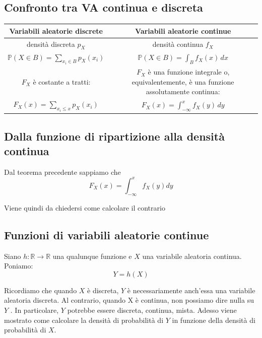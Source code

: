 \subsection{Confronto tra VA continua e discreta}
\begin{tabular}{|c|c|}
  \hline
  \textbf{Variabili aleatorie discrete} & \textbf{Variabili aleatorie continue} \\
  \hline
  densità discreta $p_X$ & densità continua $f_X$ \\
  \hline
  $\mathbb{P}(X \in B) = \sum_{x_i \in B} p_X(x_i)$ & $\mathbb{P}(X \in B) = \int_B f_X(x) \, dx$ \\
  \hline
  $F_X$ è costante a tratti: & $F_X$ è una funzione integrale o, equivalentemente, è una funzione assolutamente continua: \\
  $F_X(x) = \sum_{x_i \leq x} p_X(x_i)$ & $F_X(x) = \int_{-\infty}^x f_X(y) \, dy$ \\
  \hline
\end{tabular}

\subsection{Dalla funzione di ripartizione alla densità continua}
Dal teorema precedente sappiamo che 
\[
  F_X(x) = \int_{-\infty}^{x} f_X(y) dy
\]

Viene quindi da chiedersi come calcolare il contrario



\subsection{Funzioni di variabili aleatorie continue}
Siano $h: \mathbb{R} \to \mathbb{R}$ una qualunque funzione e $X$ una variabile aleatoria continua. Poniamo:
\[
  Y = h(X)
\]

Ricordiamo che quando $X$ è discreta, $Y$ è necessariamente anch’essa una variabile aleatoria discreta. Al contrario, quando X è continua, non possiamo dire nulla su $Y$ . In particolare, $Y$ potrebbe essere discreta, continua, mista. Adesso viene mostrato come calcolare la densità di probabilità di $Y$ in funzione della densità di probabilità di $X$.

